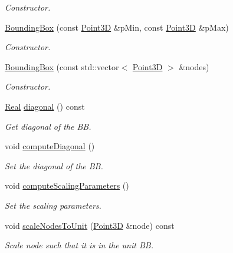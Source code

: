 \begin{DoxyCompactItemize}
\begin{DoxyCompactList}\small\item\em Constructor. \end{DoxyCompactList}\item 
\hyperlink{classFVCode3D_1_1BoundingBox_a4db0e650594edc517a2eca651452cee3}{Bounding\+Box} (const \hyperlink{classFVCode3D_1_1Point3D}{Point3D} \&p\+Min, const \hyperlink{classFVCode3D_1_1Point3D}{Point3D} \&p\+Max)
\begin{DoxyCompactList}\small\item\em Constructor. \end{DoxyCompactList}\item 
\hyperlink{classFVCode3D_1_1BoundingBox_a4c67393b3e2e2ca4c9b1e8313e20a879}{Bounding\+Box} (const std\+::vector$<$ \hyperlink{classFVCode3D_1_1Point3D}{Point3D} $>$ \&nodes)
\begin{DoxyCompactList}\small\item\em Constructor. \end{DoxyCompactList}\item 
\hyperlink{namespaceFVCode3D_a40c1f5588a248569d80aa5f867080e83}{Real} \hyperlink{classFVCode3D_1_1BoundingBox_ac0b63c86218f60d063e23251aa1bb9f8}{diagonal} () const 
\begin{DoxyCompactList}\small\item\em Get diagonal of the BB. \end{DoxyCompactList}\item 
void \hyperlink{classFVCode3D_1_1BoundingBox_a24191e6688c9db0070714f28fc70eb8e}{compute\+Diagonal} ()
\begin{DoxyCompactList}\small\item\em Set the diagonal of the BB. \end{DoxyCompactList}\item 
void \hyperlink{classFVCode3D_1_1BoundingBox_a9975a2a4ae9e3991d5f5ab1d3f1544ff}{compute\+Scaling\+Parameters} ()
\begin{DoxyCompactList}\small\item\em Set the scaling parameters. \end{DoxyCompactList}\item 
void \hyperlink{classFVCode3D_1_1BoundingBox_a20d4281f025fd6a4ee51ec8cbc47874c}{scale\+Nodes\+To\+Unit} (\hyperlink{classFVCode3D_1_1Point3D}{Point3D} \&node) const 
\begin{DoxyCompactList}\small\item\em Scale node such that it is in the unit BB. \end{DoxyCompactList}\item 

\end{DoxyCompactItemize}
